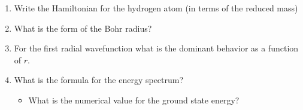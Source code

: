 

\vspace*{\fill}
\centering

\begin{enumerate}
    \item Write the Hamiltonian for the hydrogen atom (in terms of the reduced mass)
    \item What is the form of the Bohr radius?
    \item For the first radial wavefunction what is the dominant behavior as a function of $r$.
    \item What is the formula for the energy spectrum?
        \begin{itemize}
            \item What is the numerical value for the ground state energy? 
        \end{itemize}
\end{enumerate}

\centering
\vspace*{\fill}

